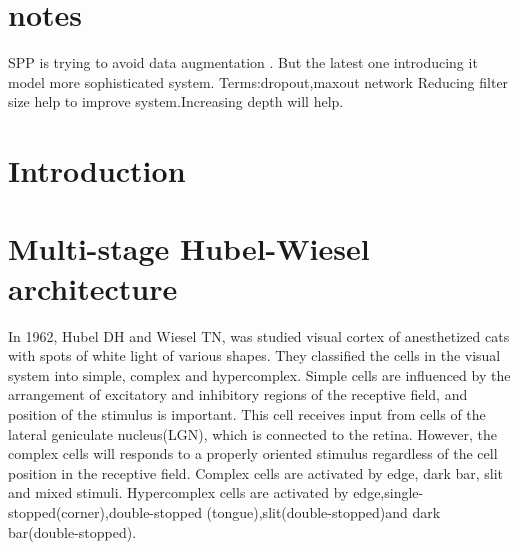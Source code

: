 \documentclass{article}
\begin{document}
\section{notes}
SPP is trying to avoid data augmentation . But the latest one introducing it model more sophisticated system.
Terms:dropout,maxout network
Reducing filter size help to improve system.Increasing depth will help.
\section{Introduction}

 
\section{Multi-stage Hubel-Wiesel architecture}
In 1962, Hubel DH and Wiesel TN\cite{Hubel1962},\cite{Hubel1965a} was studied visual cortex of anesthetized cats  with   spots of white light of various shapes. They classified the  cells in the visual system into  simple, complex and hypercomplex. Simple cells are influenced  by the arrangement of  excitatory and inhibitory regions of the receptive field, and  position of the stimulus is important. This cell receives input from cells of the lateral geniculate nucleus(LGN), which is connected to the retina. However, the complex cells will responds to  a properly  oriented stimulus regardless of the cell position in the receptive field. Complex cells are activated by edge, dark bar, slit and mixed stimuli. Hypercomplex cells are activated by edge,single-stopped(corner),double-stopped (tongue),slit(double-stopped)and dark bar(double-stopped).
\end{document}
